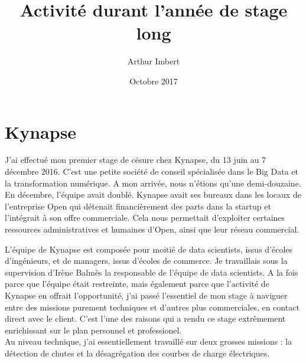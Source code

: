 \documentclass[a4paper]{article}
\author{Arthur Imbert}
\title{Activité durant l'année de stage long}
\date{Octobre 2017}
\begin{document}
	
	\maketitle
	
	\section{Kynapse}
	
	J'ai effectué mon premier stage de césure chez Kynapse, du 13 juin au 7 décembre 2016. C'est une petite société de conseil spécialisée dans le Big Data et la transformation numérique. A mon arrivée, nous n'étions qu'une demi-douzaine. En décembre, l'équipe avait doublé. Kynapse avait ses bureaux dans les locaux de l'entreprise Open qui détenait financièrement des parts dans la startup et l'intégrait à son offre commerciale. Cela nous permettait d'exploiter certaines ressources administratives et humaines d'Open, ainsi que leur réseau commercial.
	
	L'équipe de Kynapse est composée pour moitié de data scientists, issus d'écoles d'ingénieurs, et de managers, issus d'écoles de commerce. Je travaillais sous la supervision d'Irène Balmès la responsable de l'équipe de data scientists. A la fois parce que l'équipe était restreinte, mais également parce que l'activité de Kynapse en offrait l'opportunité, j'ai passé l'essentiel de mon stage à naviguer entre des missions purement techniques et d'autres plus commerciales, en contact direct avec le client. C'est l'une des raisons qui a rendu ce stage extrêmement enrichissant sur le plan personnel et professionel. \\
	
	Au niveau technique, j'ai essentiellement travaillé sur deux grosses missions : la détection de chutes et la désagrégation des courbes de charge électriques.
	
\end{document}
